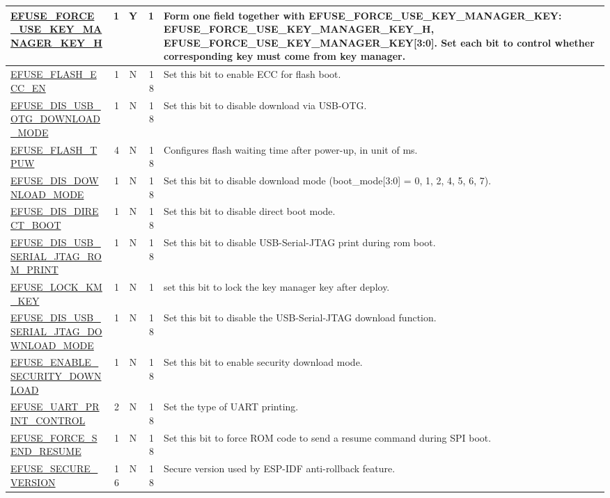 \begin{longtable}[l]{ |m{8.2cm}|r|c|r|m{9cm}| }
    \hyperref[fielddesc:EFUSEFORCEUSEKEYMANAGERKEYH]{EFUSE\_FORCE\_USE\_KEY\_MANAGER\_KEY\_H} & 1 & Y & 1 & Form one field together with EFUSE\_FORCE\_USE\_KEY\_MANAGER\_KEY: {EFUSE\_FORCE\_USE\_KEY\_MANAGER\_KEY\_H, EFUSE\_FORCE\_USE\_KEY\_MANAGER\_KEY[3:0]}. Set each bit to control whether corresponding key must come from key manager.  \\ \hline
    \hyperref[fielddesc:EFUSEFLASHECCEN]{EFUSE\_FLASH\_ECC\_EN} & 1 & N & 18 & Set this bit to enable ECC for flash boot. \\ \hline
    \hyperref[fielddesc:EFUSEDISUSBOTGDOWNLOADMODE]{EFUSE\_DIS\_USB\_OTG\_DOWNLOAD\_MODE} & 1 & N & 18 & Set this bit to disable download via USB-OTG. \\ \hline
    \hyperref[fielddesc:EFUSEFLASHTPUW]{EFUSE\_FLASH\_TPUW} & 4 & N & 18 & Configures flash waiting time after power-up, in unit of ms.\\ \hline
    \hyperref[fielddesc:EFUSEDISDOWNLOADMODE]{EFUSE\_DIS\_DOWNLOAD\_MODE} & 1 & N & 18 & Set this bit to disable download mode (boot\_mode[3:0] = 0, 1, 2, 4, 5, 6, 7). \\ \hline
    \hyperref[fielddesc:EFUSEDISDIRECTBOOT]{EFUSE\_DIS\_DIRECT\_BOOT} & 1 & N & 18 & Set this bit to disable direct boot mode. \\ \hline
    \hyperref[fielddesc:EFUSEDISUSBSERIALJTAGROMPRINT]{EFUSE\_DIS\_USB\_SERIAL\_JTAG\_ROM\_PRINT} & 1 & N & 18 & Set this bit to disable USB-Serial-JTAG print during rom boot. \\ \hline
    \hyperref[fielddesc:EFUSELOCKKMKEY]{EFUSE\_LOCK\_KM\_KEY} & 1 & N & 1 & set this bit to lock the key manager key after deploy. \\ \hline
    \hyperref[fielddesc:EFUSEDISUSBSERIALJTAGDOWNLOADMODE]{EFUSE\_DIS\_USB\_SERIAL\_JTAG\_DOWNLOAD\_MODE} & 1 & N & 18 & Set this bit to disable the USB-Serial-JTAG download function. \\ \hline
    \hyperref[fielddesc:EFUSEENABLESECURITYDOWNLOAD]{EFUSE\_ENABLE\_SECURITY\_DOWNLOAD} & 1 & N & 18 & Set this bit to enable security download mode. \\ \hline
    \hyperref[fielddesc:EFUSEUARTPRINTCONTROL]{EFUSE\_UART\_PRINT\_CONTROL} & 2 & N & 18 & Set the type of UART printing. \\ \hline
    \hyperref[fielddesc:EFUSEFORCESENDRESUME]{EFUSE\_FORCE\_SEND\_RESUME} & 1 & N & 18 & Set this bit to force ROM code to send a resume command during SPI boot. \\ \hline
    \hyperref[fielddesc:EFUSESECUREVERSION]{EFUSE\_SECURE\_VERSION} & 16 & N & 18 & Secure version used by ESP-IDF anti-rollback feature. \\ \hline

\end{longtable}
